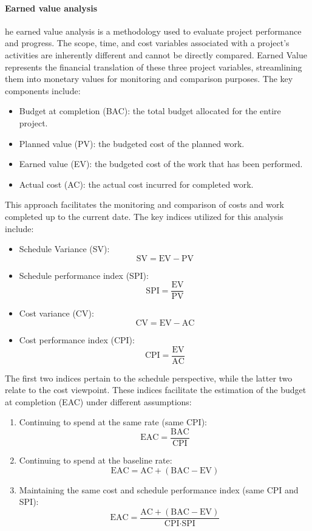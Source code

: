 \paragraph*{Earned value analysis}
he earned value analysis is a methodology used to evaluate project performance and progress. 
The scope, time, and cost variables associated with a project's activities are inherently different and cannot be directly compared.
Earned Value represents the financial translation of these three project variables, streamlining them into monetary values for monitoring and comparison purposes. 
The key components include:
\begin{itemize}
    \item Budget at completion (BAC): the total budget allocated for the entire project.
    \item Planned value (PV): the budgeted cost of the planned work.
    \item Earned value (EV): the budgeted cost of the work that has been performed.
    \item Actual cost (AC): the actual cost incurred for completed work.
\end{itemize}
This approach facilitates the monitoring and comparison of costs and work completed up to the current date.
The key indices utilized for this analysis include:
\begin{itemize}
    \item Schedule Variance (SV):
        \[\text{SV} = \text{EV} - \text{PV}\]
    \item Schedule performance index (SPI):
        \[\text{SPI} = \dfrac{\text{EV}}{\text{PV}}\]
    \item Cost variance (CV):
        \[\text{CV} = \text{EV} - \text{AC}\]
    \item Cost performance index (CPI):
        \[\text{CPI} = \dfrac{\text{EV}}{\text{AC}}\]
\end{itemize}
The first two indices pertain to the schedule perspective, while the latter two relate to the cost viewpoint.
These indices facilitate the estimation of the budget at completion (EAC) under different assumptions:
\begin{enumerate}
    \item Continuing to spend at the same rate (same CPI):
        \[\text{EAC} = \dfrac{\text{BAC}}{\text{CPI}}\]
    \item Continuing to spend at the baseline rate:
        \[\text{EAC} =\text{AC}+\left(\text{BAC}-\text{EV}\right)\]
    \item Maintaining the same cost and schedule performance index (same CPI and SPI):
        \[\text{EAC} =\dfrac{\text{AC}+\left(\text{BAC}-\text{EV}\right)}{\text{CPI}\cdot\text{SPI}}\]
\end{enumerate}

